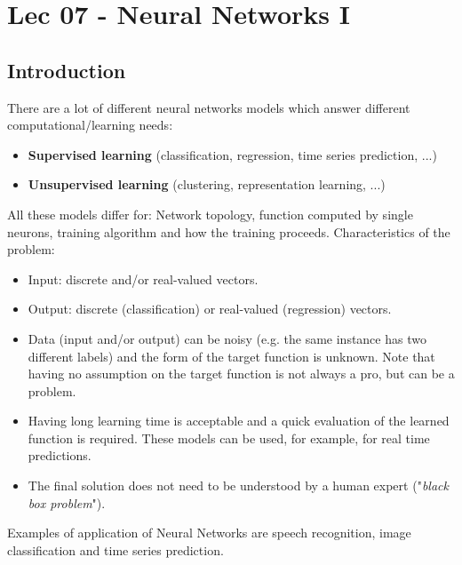 \chapter{Lec 07 - Neural Networks I}

\section{Introduction}
There are a lot of different neural networks models which answer different computational/learning needs:
\begin{itemize}
    \item \textbf{Supervised learning} (classification, regression, time series prediction, ...)
    
    \item \textbf{Unsupervised learning} (clustering, representation learning, ...)

\end{itemize}
All these models differ for: Network topology, function computed by single neurons, training algorithm and how the training proceeds.\newline\newline
Characteristics of the problem:
\begin{itemize}
    \item Input: discrete and/or real-valued vectors.
    \item Output: discrete (classification) or real-valued (regression) vectors.
    \item Data (input and/or output) can be noisy (e.g. the same instance has two different labels) and the form of the target function is unknown. Note that having no assumption on the target function is not always a pro, but can be a problem.
    \item Having long learning time is acceptable and a quick evaluation of the learned function is required. These models can be used, for example, for real time predictions.
    \item The final solution does not need to be understood by a human expert ("\textit{black box problem}").
\end{itemize}
Examples of application of Neural Networks are speech recognition, image classification and time series prediction.

